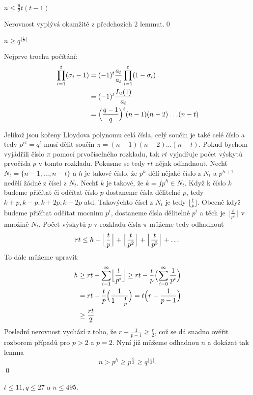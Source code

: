 \lm $n \leq \frac{9}{2} t(t-1)$

\dk Nerovnost vyplývá okamžitě z předchozích 2 lemmat.\qed

\lm $n \geq q^{\lfloor \frac{t}{2} \rfloor}$

\dk Nejprve trochu počítání:
\begin{align*}
\prod\limits_{i = 1}^t (\sigma_i - 1) &= (-1)^t \frac{a_t}{a_t} \prod\limits_{i = 1}^t (1 - \sigma_i) \\
&= (-1)^t \frac{L_t(1)}{a_t} \\
&= \Bigl(\frac{q-1}{q}\Bigr)^t (n-1)(n-2)\dots(n-t)
\end{align*}

Jelikož jsou kořeny Lloydova polynomu celá čísla, celý součin je také celé číslo a tedy $p^{rt} = q^t$ musí dělit součin $\pi = (n-1)(n-2)\dots(n-t)$. Pokud bychom vyjádřili číslo $\pi$ pomocí prvočíselného rozkladu, tak $rt$ vyjadřuje počet výskytů prvočísla $p$ v tomto rozkladu. Pokusme se tedy $rt$ nějak odhadnout. Nechť $ N_t = \{n-1,\dots,n-t\}$ a $h$ je takové číslo, že $p^h$ dělí nějaké číslo z $N_t$ a $p^{h+1}$ nedělí žádné z čísel z $N_t$. Nechť $k$ je takové, že $k = fp^h \in N_t$. Když k číslo $k$ budeme přičítat či odčítat číslo $p$ dostaneme čísla dělitelné $p$, tedy $k + p, k - p, k + 2p, k - 2p$ atd. Takovýchto čísel z $N_t$ je tedy $\lfloor \frac{t}{p} \rfloor$. Obecně když budeme přičítat odčítat mocninu $p^i$, dostaneme čísla dělitelné $p^i$ a těch je $\lfloor \frac{t}{p^i} \rfloor$ v množině $N_t$. Počet výskytů $p$ v rozkladu čísla $\pi$ můžeme tedy odhadnout
\[
rt \leq h + \Bigl\lfloor \frac{t}{p} \Bigr\rfloor + \Bigl\lfloor \frac{t}{p^2} \Bigr\rfloor + \Bigl\lfloor \frac{t}{p^3} \Bigr\rfloor + \dots
\]
To dále můžeme upravit:
\begin{align*}
h &\geq rt - \sum\limits_{i=1}^\infty \Bigl\lfloor \frac{t}{p^i} \Bigr\rfloor 
 \geq rt - \frac{t}{p} \Bigl(\sum\limits_{i=0}^\infty  \frac{1}{p^i} \Bigr) \\
& = rt - \frac{t}{p}\Bigl(\frac{1}{1-\frac{1}{p}}\Bigr) 
= t \Bigl(r - \frac{1}{p-1} \Bigr) \\
& \geq \frac{rt}{2}
\end{align*}
Poslední nerovnost vychází z toho, že $r - \frac{1}{p-1} \geq \frac{r}{2}$, což se dá snadno ověřit rozborem případů pro $p > 2$ a $p = 2$. Nyní již můžeme odhadnou $n$ a dokázat tak lemma
\[
n > p^h \geq p^{\frac{rt}{2}} \geq q^{\lfloor\frac{t}{2}\rfloor}.
\]
\qed

\lm $t \leq 11, q \leq 27$ a $n \leq 495$.

